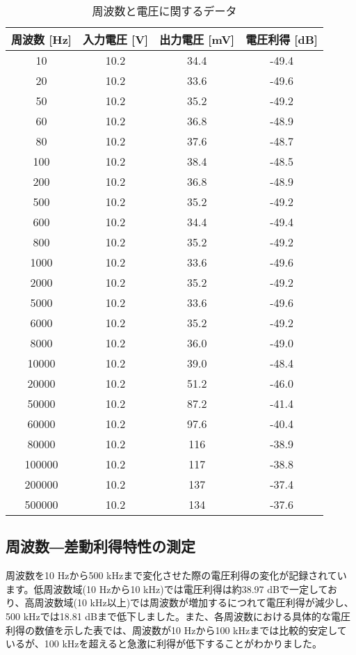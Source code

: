 \documentclass[a4paper,11pt,xelatex,ja=standard]{bxjsarticle}
\begin{document}
        \begin{table}[H]
            \centering
            \begin{tabular}{|c|c|c|c|}
                \hline
                周波数 [Hz] & 入力電圧 [V] & 出力電圧 [mV] & 電圧利得 [dB] \\
                \hline
                10 & 10.2 & 34.4 & -49.4 \\
                20 & 10.2 & 33.6 & -49.6 \\
                50 & 10.2 & 35.2 & -49.2 \\
                60 & 10.2 & 36.8 & -48.9 \\
                80 & 10.2 & 37.6 & -48.7 \\
                100 & 10.2 & 38.4 & -48.5 \\
                200 & 10.2 & 36.8 & -48.9 \\
                500 & 10.2 & 35.2 & -49.2 \\
                600 & 10.2 & 34.4 & -49.4 \\
                800 & 10.2 & 35.2 & -49.2 \\
                1000 & 10.2 & 33.6 & -49.6 \\
                2000 & 10.2 & 35.2 & -49.2 \\
                5000 & 10.2 & 33.6 & -49.6 \\
                6000 & 10.2 & 35.2 & -49.2 \\
                8000 & 10.2 & 36.0 & -49.0 \\
                10000 & 10.2 & 39.0 & -48.4 \\
                20000 & 10.2 & 51.2 & -46.0 \\
                50000 & 10.2 & 87.2 & -41.4 \\
                60000 & 10.2 & 97.6 & -40.4 \\
                80000 & 10.2 & 116 & -38.9 \\
                100000 & 10.2 & 117 & -38.8 \\
                200000 & 10.2 & 137 & -37.4 \\
                500000 & 10.2 & 134 & -37.6 \\
                \hline
            \end{tabular}
            \caption{周波数と電圧に関するデータ}
        \end{table}

    \subsection{周波数―差動利得特性の測定}
        周波数を10 Hzから500 kHzまで変化させた際の電圧利得の変化が記録されています。低周波数域(10 Hzから10 kHz)では電圧利得は約38.97 dBで一定しており、高周波数域(10 kHz以上)では周波数が増加するにつれて電圧利得が減少し、500 kHzでは18.81 dBまで低下しました。また、各周波数における具体的な電圧利得の数値を示した表では、周波数が10 Hzから100 kHzまでは比較的安定しているが、100 kHzを超えると急激に利得が低下することがわかりました。
\end{document}
